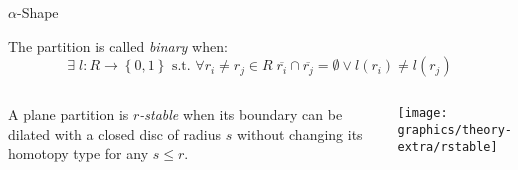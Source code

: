     \begin{frame}{$\alpha$-Shape}
         {
            \begin{definition}
                The partition is called \textit{binary} when:
                \begin{equation*}
                    \exists\;l\colon R \rightarrow \left\{0,1\right\} \text{ s.t. }\forall r_i \neq r_j \in R\; \overline{r_i} \cap \overline{r_j} = \emptyset \lor l\left(r_i\right) \neq l\left(r_j\right)
                \end{equation*}
            \end{definition}
        }
        \begin{columns}
                 {
                    \begin{definition}
                        A plane partition is \textit{$r$-stable} when its boundary can be dilated with a closed disc of radius $s$ without changing its homotopy type for any $s \leq r$.
                    \end{definition}
                }
                 {
                    \texttt{[image: graphics/theory-extra/rstable]}
                }
        \end{columns}
    \end{frame}
